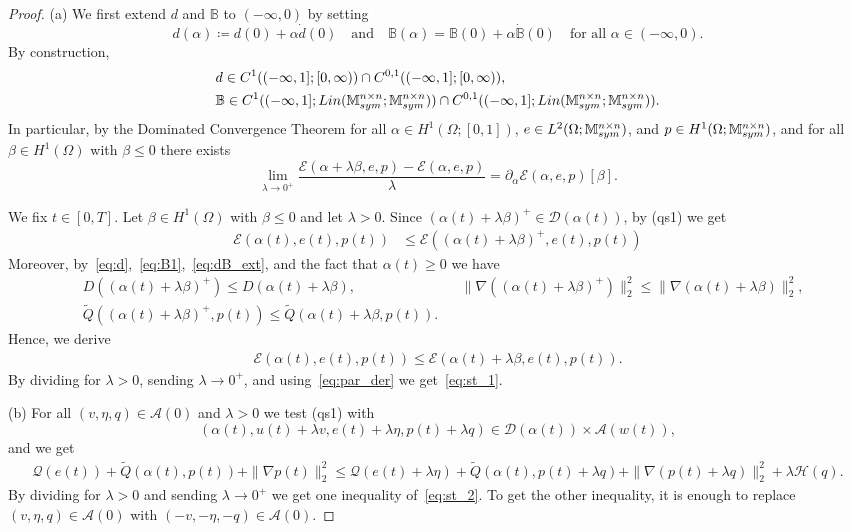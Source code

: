 \documentclass[reqno]{amsart}
\theoremstyle{definition}
\numberwithin{equation}{section}
\def\Lin {\mathop {\rm Lin}\nolimits}
\def\M {\mathbb M^{n\times n}_{\rm sym}}
\begin{document}
\begin{proof}
(a) We first extend $d$ and $\mathbb B$ to $(-\infty,0)$ by setting
\begin{equation}\label{eq:dB_ext}
d(\alpha)\coloneqq d(0)+\alpha \dot{d}(0)\quad\text{and}\quad \mathbb B(\alpha)=\mathbb B(0)+\alpha\dot{\mathbb B}(0)\quad\text{for all $\alpha\in (-\infty,0)$}.    
\end{equation}
By construction, 
\begin{align*}
&d\in C^1((-\infty,1];[0,\infty))\cap C^{0,1}((-\infty,1];[0,\infty)),\\
 &\mathbb B\in C^1((-\infty,1];\Lin(\M;\M))\cap C^{0,1}((-\infty,1];\Lin(\M;\M)).
\end{align*}
In particular, by the Dominated Convergence Theorem for all $\alpha\in H^1(\Omega;[0,1])$, $e\in L^2(\Omega;\M)$, and $p\in H^1(\Omega;\M)$, and for all $\beta\in H^1(\Omega)$ with $\beta\le 0$ there exists
\begin{equation}\label{eq:par_der}
\lim_{\lambda\to 0^+}\frac{\mathcal E(\alpha+\lambda \beta,e,p)-\mathcal E(\alpha,e,p)}{\lambda}=\partial_\alpha \mathcal E(\alpha,e,p)[\beta].
\end{equation}

We fix $t\in[0,T]$. Let $\beta\in H^1(\Omega)$ with $\beta\le 0$  and let $\lambda>0$. Since $(\alpha(t)+\lambda\beta)^+\in \mathcal D(\alpha(t))$, by (qs1) we get
\begin{align*}
\mathcal E(\alpha(t),e(t),p(t))&\le \mathcal E((\alpha(t)+\lambda\beta)^+,e(t),p(t))
\end{align*}
Moreover, by~\eqref{eq:d},~\eqref{eq:B1},~\eqref{eq:dB_ext}, and the fact that
$\alpha(t)\ge 0$ we have
\begin{align*}
&D((\alpha(t)+\lambda\beta)^+)\le D(\alpha(t)+\lambda\beta),& &\|\nabla((\alpha(t)+\lambda\beta)^+)\|^2_2\le \|\nabla(\alpha(t)+\lambda\beta)\|_2^2,\\
&\tilde Q((\alpha(t)+\lambda \beta)^+,p(t))\le \tilde Q(\alpha(t)+\lambda \beta,p(t)).  & &
\end{align*}
Hence, we derive
\begin{align*}
\mathcal E(\alpha(t),e(t),p(t))\le \mathcal E(\alpha(t)+\lambda\beta,e(t),p(t)).
\end{align*}
By dividing for $\lambda>0$, sending $\lambda\to 0^+$, and using~\eqref{eq:par_der} we get~\eqref{eq:st_1}.

(b) For all $(v,\eta,q)\in \mathcal A(0)$ and $\lambda>0$ we test (qs1) with 
\begin{equation*}
(\alpha(t),u(t)+\lambda v,e(t)+\lambda \eta,p(t)+\lambda q)\in\mathcal D(\alpha(t))\times\mathcal A(w(t)),
\end{equation*}
and we get
\begin{align*}
\mathcal Q(e(t))+\tilde Q(\alpha(t),p(t))+\|\nabla p(t)\|_2^2\le \mathcal Q(e(t)+\lambda \eta)+\tilde Q(\alpha(t),p(t)+\lambda q)+\|\nabla (p(t)+\lambda q)\|_2^2+\lambda\mathcal H(q).
\end{align*}
By dividing for $\lambda>0$ and sending $\lambda\to 0^+$ we get one inequality of~\eqref{eq:st_2}. To get the other inequality, it is enough to replace $(v,\eta,q)\in\mathcal A(0)$ with $(-v,-\eta,-q)\in\mathcal A(0)$.


\end{proof}
\end{document}
